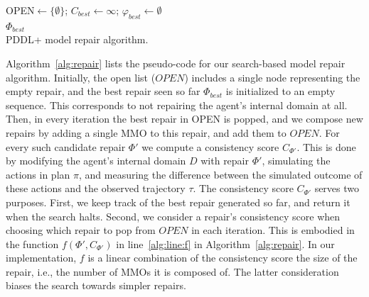 \documentclass[letterpaper]{article} %
\begin{document}
\begin{algorithm2e}
OPEN$\gets\{\emptyset\}$; 
$C_{best}\gets\infty$;
$\varphi_{best}\gets\emptyset$\\
\Return $\varPhi_{best}$\\
\caption{PDDL+ model repair algorithm.}
\label{alg:repair}
\end{algorithm2e}


Algorithm~\ref{alg:repair} lists the pseudo-code for our search-based model repair algorithm. 
Initially, the open list ($OPEN$) includes a single node representing the empty repair, 
and the best repair seen so far $\varPhi_{best}$ is initialized to an empty sequence. 
This corresponds to not repairing the agent's internal domain at all. 
Then, in every iteration the best repair in OPEN is popped, and we compose new repairs by adding a single MMO to this repair, and add them to $OPEN$.  
For every such candidate repair $\varPhi'$ we compute a consistency score $C_{\varPhi'}$. 
This is done by modifying the agent's internal domain $D$ with repair $\varPhi'$, simulating the actions in plan $\pi$, and measuring the difference between the simulated outcome of these actions and the observed trajectory $\tau$. 
The consistency score $C_{\varPhi'}$ serves two purposes. First, we keep track of the best repair generated so far, and return it when the search halts. Second, we consider a repair's consistency score when choosing which repair to pop from $OPEN$ in each iteration. This is embodied in the function $f(\varPhi', C_{\varPhi'})$ in line~\ref{alg:line:f} in Algorithm~\ref{alg:repair}. 
In our implementation, $f$ is a linear combination of the consistency score the size of the repair, i.e., the number of MMOs it is composed of. The latter consideration biases the search towards simpler repairs. 
\end{document}
